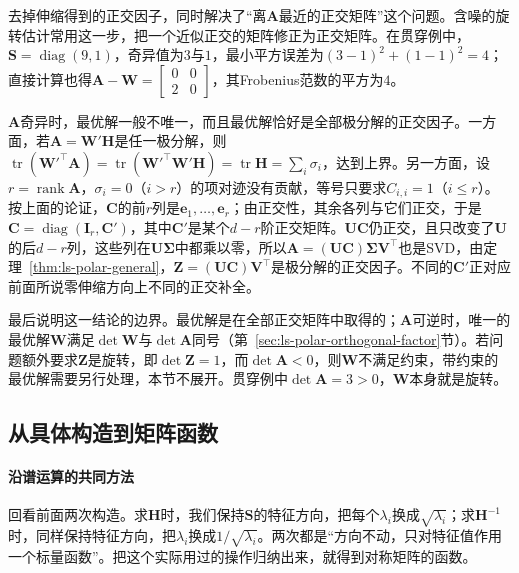 去掉伸缩得到的正交因子，同时解决了“离$\bm A$最近的正交矩阵”这个问题。含噪的旋转估计常用这一步，把一个近似正交的矩阵修正为正交矩阵。在贯穿例中，$\bm S=\operatorname{diag}(9,1)$，奇异值为$3$与$1$，最小平方误差为$(3-1)^2+(1-1)^2=4$；直接计算也得$\bm A-\bm W=\left[\begin{smallmatrix}0&0\\2&0\end{smallmatrix}\right]$，其Frobenius范数的平方为$4$。

$\bm A$奇异时，最优解一般不唯一，而且最优解恰好是全部极分解的正交因子。一方面，若$\bm A=\bm W'\bm H$是任一极分解，则$\operatorname{tr}(\bm W'^\top\bm A)=\operatorname{tr}(\bm W'^\top\bm W'\bm H)=\operatorname{tr}\bm H=\sum_i\sigma_i$，达到上界。另一方面，设$r=\operatorname{rank}\bm A$，$\sigma_i=0$（$i>r$）的项对迹没有贡献，等号只要求$C_{i,i}=1$（$i\leq r$）。按上面的论证，$\bm C$的前$r$列是$\bm e_1,\ldots,\bm e_r$；由正交性，其余各列与它们正交，于是$\bm C=\operatorname{diag}(\bm I_r,\bm C')$，其中$\bm C'$是某个$d-r$阶正交矩阵。$\bm U\bm C$仍正交，且只改变了$\bm U$的后$d-r$列，这些列在$\bm U\bm\Sigma$中都乘以零，所以$\bm A=(\bm U\bm C)\bm\Sigma\bm V^\top$也是SVD，由定理~\ref{thm:ls-polar-general}，$\bm Z=(\bm U\bm C)\bm V^\top$是极分解的正交因子。不同的$\bm C'$正对应前面所说零伸缩方向上不同的正交补全。

最后说明这一结论的边界。最优解是在全部正交矩阵中取得的；$\bm A$可逆时，唯一的最优解$\bm W$满足$\det\bm W$与$\det\bm A$同号（第~\ref{sec:ls-polar-orthogonal-factor}节）。若问题额外要求$\bm Z$是旋转，即$\det\bm Z=1$，而$\det\bm A<0$，则$\bm W$不满足约束，带约束的最优解需要另行处理，本节不展开。贯穿例中$\det\bm A=3>0$，$\bm W$本身就是旋转。

\subsection{从具体构造到矩阵函数}
\label{sec:ls-matrix-functions}
\label{sec:matrix-analysis-functions-structured-operations}

\paragraph{沿谱运算的共同方法}

回看前面两次构造。求$\bm H$时，我们保持$\bm S$的特征方向，把每个$\lambda_i$换成$\sqrt{\lambda_i}$；求$\bm H^{-1}$时，同样保持特征方向，把$\lambda_i$换成$1/\sqrt{\lambda_i}$。两次都是“方向不动，只对特征值作用一个标量函数”。把这个实际用过的操作归纳出来，就得到对称矩阵的函数。

